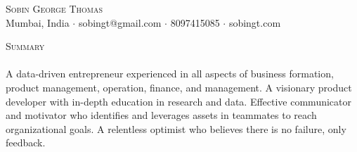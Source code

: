 \documentclass[a4paper]{article}
\newcommand{\lineunder} {
    \vspace*{-8pt} \\
    \hspace*{-18pt} \hrulefill \\
}
\newcommand{\header} [1] {
    {\hspace*{-18pt}\vspace*{6pt} \textsc{#1}}
    \vspace*{-6pt} \lineunder
}
\begin{document}
\vspace*{-40pt}

    

\vspace*{-10pt}
\begin{center}
	{\Huge \scshape {Sobin George Thomas}}\\
	Mumbai, India $\cdot$ sobingt@gmail.com $\cdot$ 8097415085 $\cdot$ sobingt.com\\
\end{center}

\header{Summary}
A data-driven entrepreneur experienced in all aspects of business formation, product management, operation, finance, and management. A visionary product developer with in-depth education in research and data. Effective communicator and motivator who identifies and leverages assets in teammates to reach organizational goals. A relentless optimist who believes there is no failure, only feedback.\\
\vspace*{2mm}
\end{document}
